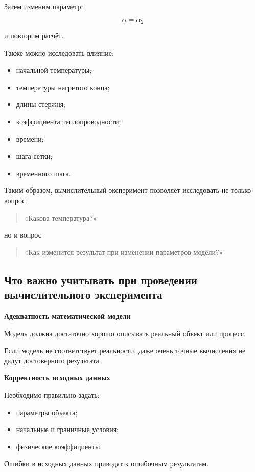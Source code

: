 Затем изменим параметр:

\[
\alpha=\alpha_2
\]

и повторим расчёт.

Также можно исследовать влияние:

\begin{itemize}
	\item начальной температуры;
	\item температуры нагретого конца;
	\item длины стержня;
	\item коэффициента теплопроводности;
	\item времени;
	\item шага сетки;
	\item временного шага.
\end{itemize}

Таким образом, вычислительный эксперимент позволяет исследовать
не только вопрос

\begin{quote}
	«Какова температура?»
\end{quote}

но и вопрос

\begin{quote}
	«Как изменится результат при изменении параметров модели?»
\end{quote}


\subsection{Что важно учитывать при проведении вычислительного эксперимента}


\textbf{Адекватность математической модели}

Модель должна достаточно хорошо описывать реальный объект или процесс.

Если модель не соответствует реальности, даже очень точные вычисления не дадут достоверного результата.

\textbf{Корректность исходных данных}

Необходимо правильно задать:

\begin{itemize}
	\item параметры объекта;
	\item начальные и граничные условия;
	\item физические коэффициенты.
\end{itemize}

Ошибки в исходных данных приводят к ошибочным результатам.

